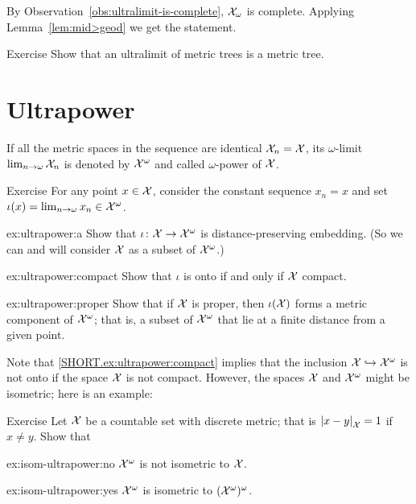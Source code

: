 By Observation~\ref{obs:ultralimit-is-complete}, $\mathcal{X}_\omega$ is complete.
Applying Lemma~\ref{lem:mid>geod} we get the statement.
\qeds


\begin{thm}{Exercise}\label{ex:lim(tree)}
Show that an ultralimit of metric trees is a metric tree. 
\end{thm}

\section{Ultrapower}

If all the metric spaces in the sequence are identical $\mathcal{X}_n=\mathcal{X}$, 
its $\omega$-limit 
$\lim_{n\to\omega}\mathcal{X}_n$
is denoted by $\mathcal{X}^\omega$
and called $\omega$-power of $\mathcal{X}$.



\begin{thm}{Exercise}\label{ex:ultrapower}
For any point $x\in \mathcal{X}$, consider the constant sequence $x_n=x$
and set $\iota(x)=\lim_{n\to\omega}x_n\in\mathcal{X}^\omega$.

\begin{subthm}{ex:ultrapower:a}
Show that $\iota\colon\mathcal{X}\to\mathcal{X}^\omega$ is distance-preserving embedding. (So we can and will consider $\mathcal{X}$ as a subset of $\mathcal{X}^\omega$.)
\end{subthm}

\begin{subthm}{ex:ultrapower:compact} 
Show that $\iota$ is onto if and only if $\mathcal{X}$ compact.
\end{subthm}

\begin{subthm}{ex:ultrapower:proper} 
Show that if $\mathcal{X}$ is proper, then $\iota(\mathcal{X})$ forms a metric component of $\mathcal{X}^\omega$; that is, a subset of $\mathcal{X}^\omega$ that lie at a finite distance from a given point.
\end{subthm}

\end{thm}

Note that \ref{SHORT.ex:ultrapower:compact} implies that the inclusion $\mathcal{X}\hookrightarrow\mathcal{X}^\omega$ is not onto if the space $\mathcal{X}$ is not compact. However, the spaces $\mathcal{X}$ and $\mathcal{X}^\omega$ might be isometric; here is an example:

\begin{thm}{Exercise}\label{ex:isom-ultrapower}
Let $\mathcal{X}$ be a countable set with discrete metric;
that is $\dist{x}{y}{\spc{X}}=1$ if $x\ne y$.
Show that 

\begin{subthm}{ex:isom-ultrapower:no}
$\mathcal{X}^\omega$ is not isometric to $\mathcal{X}$.
\end{subthm}

\begin{subthm}{ex:isom-ultrapower:yes}
$\mathcal{X}^\omega$ is  isometric to $(\mathcal{X}^\omega)^\omega$.
\end{subthm}

\end{thm}



